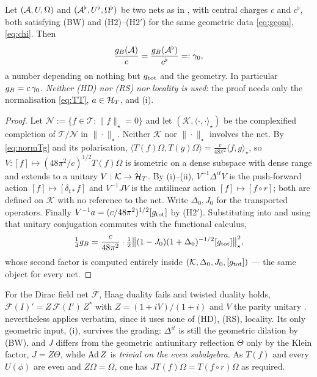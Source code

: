 \begin{theorem}\label{thm:linear}
Let $(\mathcal A,U,\Omega)$ and $(\mathcal A^{\flat},U^{\flat},\Omega^{\flat})$ be two nets as in , with
central charges $c$ and $c^{\flat}$, both satisfying \textup{(BW)} and \textup{(H2)}--\textup{(H2$'$)} for
the same geometric data \eqref{eq:geom}, \eqref{eq:chi}.  Then
\begin{equation}\label{eq:linear}
 \frac{g_{B}(\mathcal A)}{c}=\frac{g_{B}(\mathcal A^{\flat})}{c^{\flat}}=:\gamma_{0},
\end{equation}
a number depending on nothing but $g_{\rm tot}$ and the geometry.  In particular $g_{B}=c\,\gamma_{0}$.
\emph{Neither \textup{(HD)} nor \textup{(RS)} nor locality is used}: the proof needs only the normalisation
\eqref{eq:TT}, $a\in\mathcal H_T$, and (i).
\end{theorem}

\begin{proof}
Let $\mathcal N:=\{f\in\mathcal T:\|f\|_{\star}=0\}$ and let $(\mathcal K,\langle\cdot,\cdot\rangle_{\star})$
be the complexified completion of $\mathcal T/\mathcal N$ in $\|\cdot\|_{\star}$.  Neither $\mathcal K$ nor
$\|\cdot\|_{\star}$ involves the net.  By \eqref{eq:normTg} and its polarisation,
$\langle T(f)\Omega,T(g)\Omega\rangle=\frac{c}{48\pi^{2}}\langle f,g\rangle_{\star}$, so
$V:[f]\mapsto(48\pi^{2}/c)^{1/2}T(f)\Omega$ is isometric on a dense subspace with dense range and extends to
a unitary $V:\mathcal K\to\mathcal H_T$.  By (i)--(ii), $V^{-1}\Delta^{it}V$ is the push-forward
action $[f]\mapsto[\delta_{t*}f]$ and $V^{-1}JV$ is the antilinear action $[f]\mapsto[f\circ r]$; both are
defined on $\mathcal K$ with no reference to the net.  Write $\Delta_{0},J_{0}$ for the transported
operators.  Finally $V^{-1}a=(c/48\pi^{2})^{1/2}[g_{\rm tot}]$ by (H2$'$).  Substituting into
 and using that unitary conjugation commutes with the functional calculus,
\[
 \tfrac14g_{B}=\frac{c}{48\pi^{2}}\cdot\tfrac12
 \bigl\|(1-J_{0})(1+\Delta_{0})^{-1/2}[g_{\rm tot}]\bigr\|_{\star}^{2},
\]
whose second factor is computed entirely inside $(\mathcal K,\Delta_{0},J_{0},[g_{\rm tot}])$ --- the same
object for every net.
\end{proof}

\begin{remark}\label{rem:graded}
For the Dirac field net $\mathcal F$, Haag duality fails and twisted duality holds,
$\mathcal F(I)'=Z\,\mathcal F(I')\,Z^{*}$ with $Z=(1+iV)/(1+i)$ and $V$ the parity unitary \cite{Foit}.
 nevertheless applies verbatim, since it uses none of (HD), (RS), locality.  Its only
geometric input, (i), survives the grading: $\Delta^{it}$ is still the geometric dilation
by (BW), and $J$ differs from the geometric antiunitary reflection $\Theta$ only by the Klein factor,
$J=Z\Theta$, while $\operatorname{Ad} Z$ is \emph{trivial on the even subalgebra}.  As $T(f)$ and every $U(\phi)$ are
even and $Z\Omega=\Omega$, one has $JT(f)\Omega=T(f\circ r)\Omega$ as required.
\end{remark}

